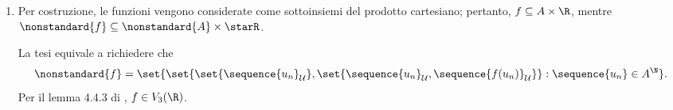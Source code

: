 {\begin{enumerate}
\begin{equation*}
        \end{equation*}Fissato $ a \in A $ qualunque, si definisce la successione \begin{equation*}
            b_{n}\coloneqq \begin{cases}
                a_{n} & n \in C'\\ 
                a & n \notin C' 
            \end{cases}\qquad b_{n} \in A, \forall\, n \in \N
        \end{equation*}Poiché $ C' \in \mathcal{U}$, $ \sequence{a_{n} }_{\mathcal{U}} = \sequence{b_{n} }_{\mathcal{U}} $, e dunque $ \sequence{a_{n} }_{\mathcal{U}} \in \set{\sequence{u_{n} }_{\mathcal{U}}: u_{n} \in A, \forall\, n \in \N }  $.
        \item Per costruzione, le funzioni vengono considerate come sottoinsiemi del prodotto cartesiano; pertanto, $ f \subseteq A \times \R $, mentre $ \nonstandard{f} \subseteq \nonstandard{A}\times \starR $. 
        
        La tesi equivale a richiedere che \begin{equation*}
            \nonstandard{f} = \set{
                \set{\set{\sequence{u_{n} }_{\mathcal{U}}}, \set{\sequence{u_{n} }_{\mathcal{U}}, \sequence{f(u_{n} ) }_{\mathcal{U}}}}: \sequence{u_{n} } \in A^{\N}
            }.
        \end{equation*}Per il lemma 4.4.3 di \cite{chang_model_2012}, $ f \in V_3(\R) $. 
        

\end{enumerate}}
